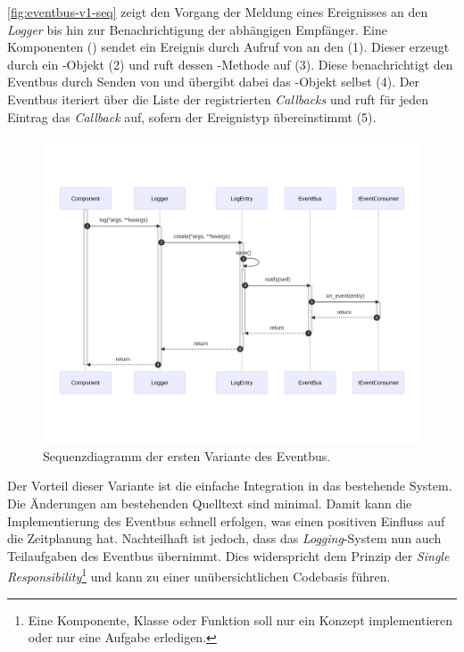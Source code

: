 \autoref{fig:eventbus-v1-seq} zeigt den Vorgang der Meldung eines Ereignisses an den \emph{Logger} bis hin zur Benachrichtigung der abhängigen Empfänger. Eine Komponenten () sendet ein Ereignis durch Aufruf von  an den  (1). Dieser erzeugt durch  ein -Objekt (2) und ruft dessen -Methode auf (3). Diese benachrichtigt den Eventbus durch Senden von  und übergibt dabei das -Objekt selbst (4). Der Eventbus iteriert über die Liste der registrierten \emph{Callbacks} und ruft für jeden Eintrag das \emph{Callback} auf, sofern der Ereignistyp übereinstimmt (5).\\

\begin{figure}[!ht]
	\centering
	\includegraphics[width=1.0\linewidth]{images/diagrams/eventbus-v1-seq.png}
	\caption{Sequenzdiagramm der ersten Variante des Eventbus.}
	\label{fig:eventbus-v1-seq}
\end{figure}

Der Vorteil dieser Variante ist die einfache Integration in das bestehende System. Die Änderungen am bestehenden Quelltext sind minimal. Damit kann die Implementierung des Eventbus schnell erfolgen, was einen positiven Einfluss auf die Zeitplanung hat. Nachteilhaft ist jedoch, dass das \emph{Logging}-System nun auch Teilaufgaben des Eventbus übernimmt. Dies widerspricht dem Prinzip der \emph{Single Responsibility}\footnote{Eine Komponente, Klasse oder Funktion soll nur ein Konzept implementieren oder nur eine Aufgabe erledigen.} und kann zu einer unübersichtlichen Codebasis führen.

